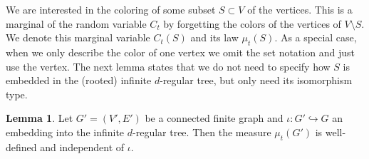 \documentclass{article}
\theoremstyle{definition}
\newtheorem{lemma}[definition]{Lemma}
\begin{document}
We are interested in the coloring of some subset $S\subset V$ of the vertices. This is a marginal of the random variable $C_t$ by forgetting the colors of the vertices of $V\setminus S$. We denote this marginal variable $C_{t}(S)$ and its law $\mu_{t}(S)$. As a special case, when we only describe the color of one vertex we omit the set notation and just use the vertex. The next lemma states that we do not need to specify how $S$ is embedded in the (rooted) infinite $d$-regular tree, but only need its isomorphism type.

\begin{lemma}\label{lemma:marginal} Let $G'=(V',E')$ be a connected finite graph and $\iota:G'\hookrightarrow G$ an embedding into the infinite $d$-regular tree. Then the measure $\mu_t(G')$ is well-defined and independent of $\iota.$
\end{lemma}
\end{document}
